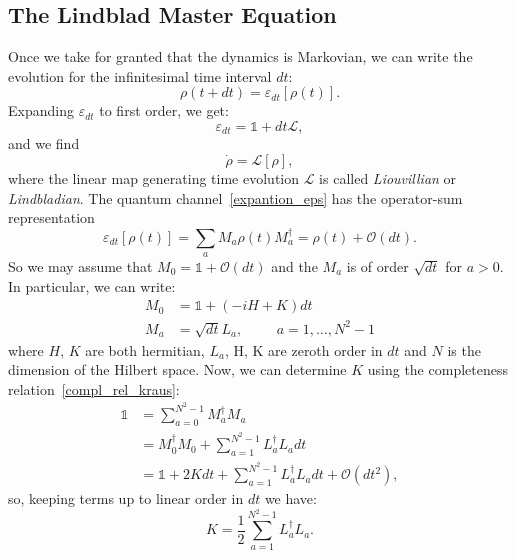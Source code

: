 \subsection{The Lindblad Master Equation}
Once we take for granted that the dynamics is Markovian, we can write the evolution for the infinitesimal time interval $dt$:
\begin{equation}
    \rho(t+dt) = \varepsilon_{dt}[\rho(t)].
\end{equation}
Expanding $\varepsilon_{dt}$ to first order, we get:
\begin{equation}
\label{expantion_eps}
    \varepsilon_{dt} = \mathds{1} + dt\mathcal{L},
\end{equation}
and we find
\begin{equation}
    \Dot{\rho} = \mathcal{L}[\rho],
\end{equation}
where the linear map generating time evolution $\mathcal{L}$ is called \emph{Liouvillian} or \emph{Lindbladian}. 
The quantum channel~\ref{expantion_eps} has the operator-sum representation
\begin{equation}
\label{op_sum_repr}
    \varepsilon_{dt}[\rho(t)] = \sum_a M_a \rho(t) M_a^\dagger = \rho(t) + \mathcal{O}(dt).
\end{equation}
So we may assume that $M_0 = \mathds{1} + \mathcal{O}(dt)$ and the $M_a$ is of order $\sqrt{dt}$ for $a>0$. In particular, we can write:
\begin{align}
    M_0 &= \mathds{1} + (-iH+K)dt \\
    M_a &= \sqrt{dt}L_a, \hspace{1cm} a = 1,\dots,N^2-1
\end{align}
where $H$, $K$ are both hermitian, $L_a$, H, K are zeroth order in $dt$ and $N$ is the dimension of the Hilbert space.
Now, we can determine $K$ using the completeness relation~\ref{compl_rel_kraus}:
\begin{equation}
\begin{split}
    \mathds{1} &= \sum_{a=0}^{N^2-1} M_a^\dagger M_a \\
               &= M_0^\dagger M_0 + \sum_{a=1}^{N^2-1} L_a^\dagger L_a dt \\
               &= \mathds{1} +2Kdt + \sum_{a=1}^{N^2-1} L_a^\dagger L_a dt + \mathcal{O}(dt^2),
\end{split}
\end{equation}
so, keeping terms up to linear order in $dt$ we have:
\begin{equation*}
    K = \frac{1}{2} \sum_{a=1}^{N^2-1} L_a^\dagger L_a.
\end{equation*}
